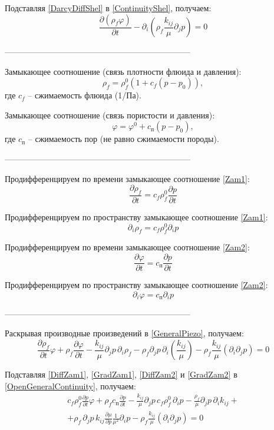 \documentclass[a4paper,12pt]{article}
\newcommand{\beq}{\begin{equation}}
\newcommand{\eeq}{\end{equation}}
\begin{document}
Подставляя \eqref{DarcyDiffShel} в \eqref{ContinuityShel}, получаем:
\beq\label{GeneralPiezo}
\frac{\partial\left(\rho_f\varphi\right)}{\partial t}-\partial_i\left(\rho_f\frac{k_{ij}}{\mu}\partial_j p\right)=0
\eeq

--------------------------------------------------------------------

Замыкающее соотношение (связь плотности флюида и давления):
\beq\label{Zam1}
\rho_f=\rho_f^0\left(1+c_f\left(p-p_0\right)\right),
\eeq
где $c_f$ -- сжимаемость флюида (1/Па).


Замыкающее соотношение (связь пористости и давления):
\beq\label{Zam2}
\varphi=\varphi^0+c_{\text{п}}\left(p-p_0\right),
\eeq
где $c_{\text{п}}$ -- сжимаемость пор (не равно сжимаемости породы).

--------------------------------------------------------------------

Продифференцируем по времени замыкающее соотношение \eqref{Zam1}:
\beq\label{DiffZam1}
\frac{\partial\rho_f}{\partial t}=c_f\rho_f^0\frac{\partial p}{\partial t}
\eeq

Продифференцируем по пространству замыкающее соотношение \eqref{Zam1}:
\beq\label{GradZam1}
\partial_i\rho_f=c_f\rho_f^0\partial_i p
\eeq

Продифференцируем по времени замыкающее соотношение \eqref{Zam2}:
\beq\label{DiffZam2}
\frac{\partial\varphi}{\partial t}=c_\text{п}\frac{\partial p}{\partial t}
\eeq

Продифференцируем по пространству замыкающее соотношение \eqref{Zam2}:
\beq\label{GradZam2}
\partial_i\varphi=c_\text{п}\partial_i p
\eeq

--------------------------------------------------------------------

Раскрывая производные произведений в \eqref{GeneralPiezo}, получаем:
\beq\label{OpenGeneralContinuity}
\frac{\partial\rho_f}{\partial t}\varphi+\rho_f\frac{\partial\varphi}{\partial t}-\frac{k_{ij}}{\mu}\partial_j p\,\partial_i\rho_f-\rho_f\partial_j p\,\partial_i\!\left(\frac{k_{ij}}{\mu}\right)-\rho_f\frac{k_{ij}}{\mu}\left(\partial_i\partial_j p\right)=0
\eeq

Подставляя \eqref{DiffZam1}, \eqref{GradZam1}, \eqref{DiffZam2} и \eqref{GradZam2} в \eqref{OpenGeneralContinuity}, получаем:
\begin{multline}\label{Expanded}
c_f\rho_f^0\frac{\partial p}{\partial t}\varphi+\rho_f c_\text{п}\frac{\partial p}{\partial t}-\frac{k_{ij}}{\mu}\partial_j p\,c_f\rho_f^0\,\partial_i p-\frac{\rho_f}{\mu}\partial_j p\,\partial_i k_{ij}+\\+\rho_f\,\partial_j p\,k_{ij}\frac{\partial\mu}{\partial p}\frac{1}{\mu^2}\partial_i p-\rho_f\frac{k_{ij}}{\mu}\left(\partial_i\partial_j p\right)=0
\end{multline}
\end{document}
